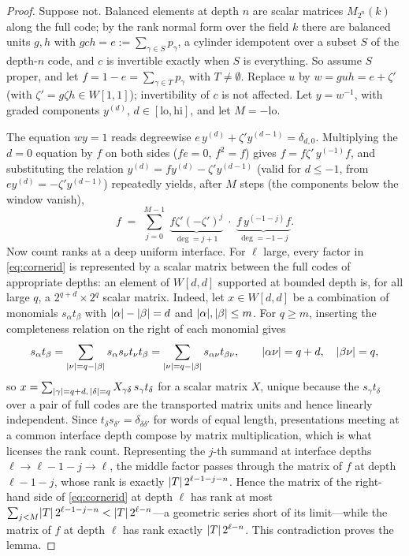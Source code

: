 \documentclass[11pt]{amsart}
\theoremstyle{definition}
\theoremstyle{plain}
\DeclarePairedDelimiter{\abs}{\lvert}{\rvert}
\begin{document}
\begin{proof}
Suppose not.  Balanced elements at depth \(n\) are scalar matrices \(M_{2^n}(k)\) along the full code; by the rank normal form over the field \(k\) there are balanced units \(g,h\) with \(gch=e:=\sum_{\gamma\in S}p_\gamma\), a cylinder idempotent over a subset \(S\) of the depth-\(n\) code, and \(c\) is invertible exactly when \(S\) is everything.  So assume \(S\) proper, and let \(f=1-e=\sum_{\gamma\in T}p_\gamma\) with \(T\ne\emptyset\).  Replace \(u\) by \(w=guh=e+\zeta'\) (with \(\zeta'=g\zeta h\in W[1,1]\)); invertibility of \(c\) is not affected.  Let \(y=w^{-1}\), with graded components \(y^{(d)}\), \(d\in[\mathrm{lo},\mathrm{hi}]\), and let \(M=-\mathrm{lo}\).

The equation \(wy=1\) reads degreewise \(e\,y^{(d)}+\zeta'y^{(d-1)}=\delta_{d,0}\).  Multiplying the \(d=0\) equation by \(f\) on both sides (\(fe=0\), \(f^2=f\)) gives \(f=f\zeta'\,y^{(-1)}f\), and substituting the relation \(y^{(d)}=fy^{(d)}-\zeta'y^{(d-1)}\) (valid for \(d\leq-1\), from \(ey^{(d)}=-\zeta'y^{(d-1)}\)) repeatedly yields, after \(M\) steps (the components below the window vanish),
\begin{equation}\label{eq:cornerid}
 f\;=\;\sum_{j=0}^{M-1}\;\underbrace{f\zeta'(-\zeta')^{j}}_{\deg=j+1}\;\cdot\;\underbrace{f\,y^{(-1-j)}f}_{\deg=-1-j} .
\end{equation}
Now count ranks at a deep uniform interface.  For \(\ell\) large, every factor in \eqref{eq:cornerid} is represented by a scalar matrix between the full codes of appropriate depths: an element of \(W[d,d]\) supported at bounded depth is, for all large \(q\), a \(2^{q+d}\times2^{q}\) scalar matrix.  Indeed, let \(x\in W[d,d]\) be a combination of monomials \(s_\alpha t_\beta\) with \(\abs\alpha-\abs\beta=d\) and \(\abs\alpha,\abs\beta\leq m\).  For \(q\geq m\), inserting the completeness relation on the right of each monomial gives
\[
 s_\alpha t_\beta=\sum_{\abs\nu=q-\abs\beta}s_\alpha s_\nu t_\nu t_\beta=\sum_{\abs\nu=q-\abs\beta}s_{\alpha\nu}t_{\beta\nu},
 \qquad\abs{\alpha\nu}=q+d,\quad\abs{\beta\nu}=q,
\]
so \(x=\sum_{\abs\gamma=q+d,\,\abs\delta=q}X_{\gamma\delta}\,s_\gamma t_\delta\) for a scalar matrix \(X\), unique because the \(s_\gamma t_\delta\) over a pair of full codes are the transported matrix units and hence linearly independent.  Since \(t_\delta s_{\delta'}=\delta_{\delta\delta'}\) for words of equal length, presentations meeting at a common interface depth compose by matrix multiplication, which is what licenses the rank count.  Representing the \(j\)-th summand at interface depths \(\ell\to\ell-1-j\to\ell\), the middle factor passes through the matrix of \(f\) at depth \(\ell-1-j\), whose rank is exactly \(\abs T\,2^{\ell-1-j-n}\).  Hence the matrix of the right-hand side of \eqref{eq:cornerid} at depth \(\ell\) has rank at most \(\sum_{j<M}\abs T\,2^{\ell-1-j-n}<\abs T\,2^{\ell-n}\)---a geometric series short of its limit---while the matrix of \(f\) at depth \(\ell\) has rank exactly \(\abs T\,2^{\ell-n}\).  This contradiction proves the lemma.
\end{proof}
\end{document}
